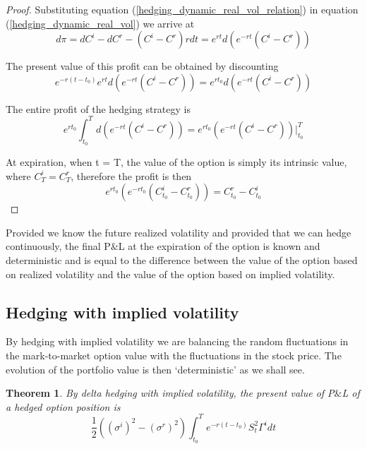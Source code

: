 \documentclass[10pt]{article}
\theoremstyle{plain}
\newtheorem{theorem}{Theorem}[section]
\numberwithin{equation}{section}
\numberwithin{table}{section}
\newcommand{\s}{\sigma}
\newcommand{\prt}[1]{\left( #1 \right)}  %
\begin{document}
\begin{proof}
    Substituting equation (\ref{hedging_dynamic_real_vol_relation}) in equation (\ref{hedging_dynamic_real_vol}) we arrive at
    \[
        d\pi = dC^i - dC^r - (C^i -C^r)rdt   = e^{rt} d\prt{e^{-rt}(C^i - C^r)}    
    \]

    The present value of this profit can be obtained by discounting
    \[
        e^{-r(t-t_0)}e^{rt} d\prt{e^{-rt}(C^i - C^r)}  = e^{rt_0} d\prt{e^{-rt}(C^i - C^r)} 
    \] 

    The entire profit of the hedging strategy is 
    \[
        e^{rt_0} \int_{t_0}^T d\prt{e^{-rt}(C^i - C^r)} = e^{rt_0} \prt{e^{-rt}(C^i - C^r)} \left. \right|_{t_0}^T
    \]

    At expiration, when t = T, the value of the option is simply its intrinsic value, where $C^i_T=C^r_T$, therefore the profit is then 
    \[
        e^{rt_0}\prt{e^{-rt_0} (C^i_{t_0} - C^r_{t_0})} = C^r_{t_0} - C^i_{t_0}  
    \] 

\end{proof}

Provided we know the future realized
volatility and provided that we can hedge continuously, the final P$\&$L
at the expiration of the option is known and deterministic and is equal to
the difference between the value of the option based on realized volatility
and the value of the option based on implied volatility.



\subsection{Hedging with implied volatility}
By hedging with implied volatility we are balancing
the random fluctuations in the mark-to-market option value with the
fluctuations in the stock price. The evolution of the portfolio value is
then ‘deterministic’ as we shall see.


\begin{theorem}
    By delta hedging with implied volatility, the present value of P$\&$L of a hedged option position is 
    \[
        \frac{1}{2}\prt{(\s^i)^2 - (\s^r)^2 }  \int_{t_0}^T e^{-r(t-t_0)}  S^2_t \Gamma^i dt  
    \]
    \label{theorem_hedging_imp_vol}
\end{theorem}
\end{document}
